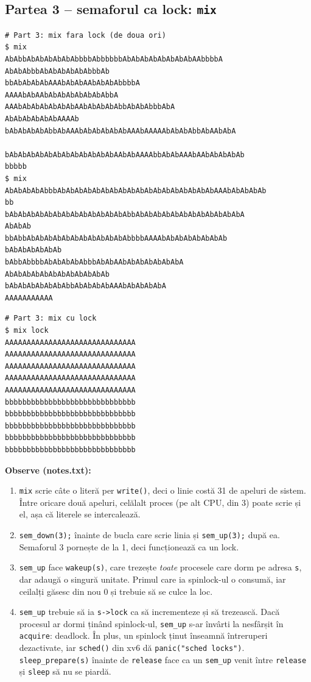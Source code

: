 \documentclass[12pt,a4paper]{article}
\begin{document}
\subsection{Partea 3 -- semaforul ca lock: \texttt{mix}}
\begin{lstlisting}[caption={mix fără lock -- literele se amestecă}]
# Part 3: mix fara lock (de doua ori)
$ mix
AbAbbAbAbAbAbAbAbbbbAbbbbbbAbAbAbAbAbAbAbAbAAbbbbA
AbAbAbbbAbAbAbAbAbAbbbAb
bbAbAbAbAbAAAbAbAbAAbAbAbAbbbbA
AAAAbAbAAbAbAbAbAbAbAbAbbA
AAAbAbAbAbAbAbAbAAbAbAbAbAbbAbAbAbbbAbA
AbAbAbAbAbAbAAAAb
bAbAbAbAbAbbAbAAAbAbAbAbAbAbAAAbAAAAAbAbAbAbbAbAAbAbA

bAbAbAbAbAbAbAbAbAbAbAbAbAAbAbAAAAbbAbAbAAAbAAbAbAbAbAb
bbbbb
$ mix
AbAbAbAbAbbbAbAbAbAbAbAbAbAbAbAbAbAbAbAbAbAbAbAbAAAbAbAbAbAb
bb
bAbAbAbAbAbAbAbAbAbAbAbAbAbAbbAbAbAbAbAbAbAbAbAbAbAbAbA
AbAbAb
bbAbbAbAbAbAbAbAbAbAbAbAbAbAbbbbAAAAbAbAbAbAbAbAbAb
bAbAbAbAbAbAb
bAbbAbbbbAbAbAbAbAbbbAbAbAAbAbAbAbAbAbAbA
AbAbAbAbAbAbAbAbAbAbAbAb
bAbAbAbAbAbAbAbbAbAbAbAbAAAbAbAbAbAbA
AAAAAAAAAAA
\end{lstlisting}
\begin{lstlisting}[caption={mix lock -- fiecare linie rămâne întreagă}]
# Part 3: mix cu lock
$ mix lock
AAAAAAAAAAAAAAAAAAAAAAAAAAAAAA
AAAAAAAAAAAAAAAAAAAAAAAAAAAAAA
AAAAAAAAAAAAAAAAAAAAAAAAAAAAAA
AAAAAAAAAAAAAAAAAAAAAAAAAAAAAA
AAAAAAAAAAAAAAAAAAAAAAAAAAAAAA
bbbbbbbbbbbbbbbbbbbbbbbbbbbbbb
bbbbbbbbbbbbbbbbbbbbbbbbbbbbbb
bbbbbbbbbbbbbbbbbbbbbbbbbbbbbb
bbbbbbbbbbbbbbbbbbbbbbbbbbbbbb
bbbbbbbbbbbbbbbbbbbbbbbbbbbbbb
\end{lstlisting}

\textbf{Observe (notes.txt):}
\begin{enumerate}
    \item \texttt{mix} scrie câte o literă per \texttt{write()}, deci o linie costă 31 de apeluri de sistem. Între oricare două apeluri, celălalt proces (pe alt CPU, din 3) poate scrie și el, așa că literele se intercalează.
    \item \texttt{sem\_down(3);} înainte de bucla care scrie linia și \texttt{sem\_up(3);} după ea. Semaforul 3 pornește de la 1, deci funcționează ca un lock.
    \item \texttt{sem\_up} face \texttt{wakeup(s)}, care trezește \emph{toate} procesele care dorm pe adresa \texttt{s}, dar adaugă o singură unitate. Primul care ia spinlock-ul o consumă, iar ceilalți găsesc din nou 0 și trebuie să se culce la loc.
    \item \texttt{sem\_up} trebuie să ia \texttt{s->lock} ca să incrementeze și să trezească. Dacă procesul ar dormi ținând spinlock-ul, \texttt{sem\_up} s-ar învârti la nesfârșit în \texttt{acquire}: deadlock. În plus, un spinlock ținut înseamnă întreruperi dezactivate, iar \texttt{sched()} din xv6 dă \texttt{panic("sched locks")}. \texttt{sleep\_prepare(s)} înainte de \texttt{release} face ca un \texttt{sem\_up} venit între \texttt{release} și \texttt{sleep} să nu se piardă.
\end{enumerate}
\end{document}
